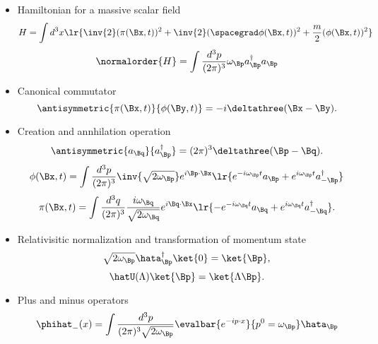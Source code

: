 \begin{itemize}
\item Hamiltonian for a massive scalar field
\begin{dmath}\label{eqn:usefulFormulas:360}
H
= \int d^3 x \lr{ \inv{2} (\pi(\Bx, t))^2 + \inv{2} (\spacegrad \phi(\Bx, t))^2 + \frac{m}{2} (\phi(\Bx, t))^2 }
\end{dmath}
\begin{dmath}\label{eqn:usefulFormulas:380}
\normalorder{H}
= \int \frac{d^3 p}{(2 \pi)^3} \omega_\Bp a_\Bp^\dagger a_\Bp
\end{dmath}
\item Canonical commutator
\begin{dmath}\label{eqn:usefulFormulas:400}
\antisymmetric{\pi(\Bx, t)}{\phi(\By, t)} = -i \deltathree(\Bx - \By).
\end{dmath}
\item Creation and annhilation operation
\begin{dmath}\label{eqn:usefulFormulas:420}
\antisymmetric
{a_\Bq}
{a^\dagger_\Bp}
=
(2 \pi)^3
\deltathree(\Bp - \Bq).
\end{dmath}
\begin{dmath}\label{eqn:usefulFormulas:440}
\phi(\Bx, t)
=
\int \frac{d^3 p}{(2\pi)^3} \inv{\sqrt{2 \omega_\Bp}} e^{i \Bp \cdot \Bx}
\lr{
   e^{-i \omega_\Bp t} a_\Bp
   +
   e^{i \omega_\Bp t} a_{-\Bp}^\dagger
}
\end{dmath}
\begin{dmath}\label{eqn:usefulFormulas:460}
\pi(\Bx, t)
=
\int \frac{d^3 q}{(2\pi)^3}
\frac{i \omega_\Bq }{ \sqrt{2 \omega_\Bq}}
e^{i \Bq \cdot \Bx}
\lr{
   -e^{-i \omega_\Bq t} a_\Bq
   +
   e^{i \omega_\Bq t} a_{-\Bq}^\dagger
}.
\end{dmath}
\item Relativisitic normalization and transformation of momentum state
\begin{dmath}\label{eqn:usefulFormulas:580}
\sqrt{2 \omega_{ \Bp}} \hata^\dagger_{ \Bp} \ket{0} = \ket{\Bp},
\end{dmath}
\begin{dmath}\label{eqn:usefulFormulas:600}
\hatU(\Lambda) \ket{\Bp} = \ket{\Lambda \Bp}.
\end{dmath}
\item Plus and minus operators
\begin{dmath}\label{eqn:usefulFormulas:620}
\begin{aligned}
\phihat_{-}(x) &=
\int \frac{d^3 p}{(2 \pi)^3 \sqrt{2 \omega_\Bp}}
\evalbar{
e^{-i p \cdot x} }{p^0 = \omega_\Bp} \hata_\Bp \\

\end{aligned}
\end{dmath}
\end{itemize}
